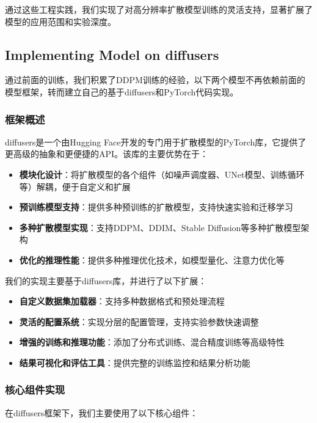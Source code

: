 \documentclass{ctexart}
\begin{document}
\vspace{0.5em}
\noindent
通过这些工程实践，我们实现了对高分辨率扩散模型训练的灵活支持，显著扩展了模型的应用范围和实验深度。

\subsection{Implementing Model on diffusers}
\noindent
通过前面的训练，我们积累了DDPM训练的经验，以下两个模型不再依赖前面的模型框架，转而建立自己的基于diffusers和PyTorch代码实现。

\subsubsection{框架概述}
\noindent
diffusers是一个由Hugging Face开发的专门用于扩散模型的PyTorch库，它提供了更高级的抽象和更便捷的API。该库的主要优势在于：

\begin{itemize}
    \item \textbf{模块化设计}：将扩散模型的各个组件（如噪声调度器、UNet模型、训练循环等）解耦，便于自定义和扩展
    \item \textbf{预训练模型支持}：提供多种预训练的扩散模型，支持快速实验和迁移学习
    \item \textbf{多种扩散模型实现}：支持DDPM、DDIM、Stable Diffusion等多种扩散模型架构
    \item \textbf{优化的推理性能}：提供多种推理优化技术，如模型量化、注意力优化等
\end{itemize}

\noindent
我们的实现主要基于diffusers库，并进行了以下扩展：

\begin{itemize}
    \item \textbf{自定义数据集加载器}：支持多种数据格式和预处理流程
    \item \textbf{灵活的配置系统}：实现分层的配置管理，支持实验参数快速调整
    \item \textbf{增强的训练和推理功能}：添加了分布式训练、混合精度训练等高级特性
    \item \textbf{结果可视化和评估工具}：提供完整的训练监控和结果分析功能
\end{itemize}

\subsubsection{核心组件实现}
\noindent
在diffusers框架下，我们主要使用了以下核心组件：
\end{document}
